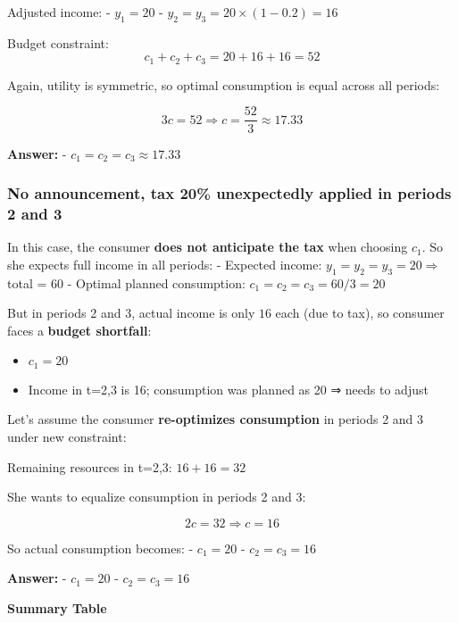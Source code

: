 \documentclass[
]{article}
\providecommand{\tightlist}{%
  \setlength{\itemsep}{0pt}\setlength{\parskip}{0pt}}
\begin{document}
Adjusted income: - \(y_1 = 20\) -
\(y_2 = y_3 = 20 \times (1 - 0.2) = 16\)

Budget constraint: \[
c_1 + c_2 + c_3 = 20 + 16 + 16 = 52
\]

Again, utility is symmetric, so optimal consumption is equal across all
periods:

\[
3c = 52 \Rightarrow c = \frac{52}{3} \approx 17.33
\]

\textbf{Answer:} - \(c_1 = c_2 = c_3 \approx 17.33\)

\subsubsection{No announcement, tax 20\% unexpectedly applied in periods
2 and
3}\label{no-announcement-tax-20-unexpectedly-applied-in-periods-2-and-3}

In this case, the consumer \textbf{does not anticipate the tax} when
choosing \(c_1\). So she expects full income in all periods: - Expected
income: \(y_1 = y_2 = y_3 = 20 \Rightarrow\) total = 60 - Optimal
planned consumption: \(c_1 = c_2 = c_3 = 60 / 3 = 20\)

But in periods 2 and 3, actual income is only \(16\) each (due to tax),
so consumer faces a \textbf{budget shortfall}:

\begin{itemize}
\tightlist
\item
  \(c_1 = 20\)
\item
  Income in t=2,3 is 16; consumption was planned as 20 ⇒ needs to adjust
\end{itemize}

Let's assume the consumer \textbf{re-optimizes consumption} in periods 2
and 3 under new constraint:

Remaining resources in t=2,3: \(16 + 16 = 32\)

She wants to equalize consumption in periods 2 and 3:

\[
2c = 32 \Rightarrow c = 16
\]

So actual consumption becomes: - \(c_1 = 20\) - \(c_2 = c_3 = 16\)

\textbf{Answer:} - \(c_1 = 20\) - \(c_2 = c_3 = 16\)

\textbf{Summary Table}
\end{document}
